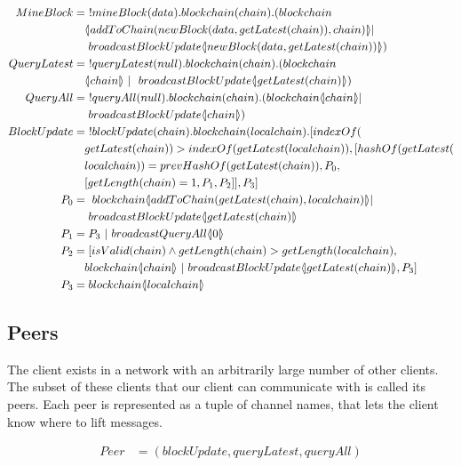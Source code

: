 \begin{align*}
    MineBlock &=\ !mineBlock(data).blockchain(chain).(blockchain\\
        &\quad \lift{}{addToChain(newBlock(data,getLatest(chain)),chain)}|\\
        &\quad \ broadcastBlockUpdate\lift{}{newBlock(data, getLatest(chain))})\\
    QueryLatest &=\ !queryLatest(null).blockchain(chain).(blockchain\\
        &\quad \lift{}{chain}\ |\ \ broadcastBlockUpdate\lift{}{getLatest(chain)})\\
    QueryAll &=\ !queryAll(null).blockchain(chain).(blockchain\lift{}{chain}|\\
        &\quad \ broadcastBlockUpdate\lift{}{chain})\\
    BlockUpdate &=\ !blockUpdate(chain).blockchain(localchain).[indexOf(\\
        &\quad getLatest(chain))>indexOf(getLatest(localchain)),[hashOf(getLatest(\\
        &\quad localchain))=prevHashOf(getLatest(chain)),P_0,\\
        &\quad [getLength(chain)=1,P_1,P_2]],P_3]\\
    P_0 &=\ blockchain\lift{}{addToChain(getLatest(chain),localchain)}|\\
        &\quad \ broadcastBlockUpdate\lift{}{getLatest(chain)}\\
    P_1 &= P_3\ |\ broadcastQueryAll \lift{}{0}\\
    P_2 &= [isValid(chain) \land getLength(chain) > getLength(localchain),\\
        &\quad blockchain\lift{}{chain}\ |\ broadcastBlockUpdate \lift{}{getLatest(chain)},P_3]\\
    P_3 &= blockchain\lift{}{localchain}
\end{align*}

\subsection{Peers}
The client exists in a network with an arbitrarily large number of other clients.
The subset of these clients that our client can communicate with is called its peers.
Each peer is represented as a tuple of channel names, that lets the client know where to lift messages.

\begin{align*}
    Peer &= (blockUpdate, queryLatest, queryAll)
\end{align*}


